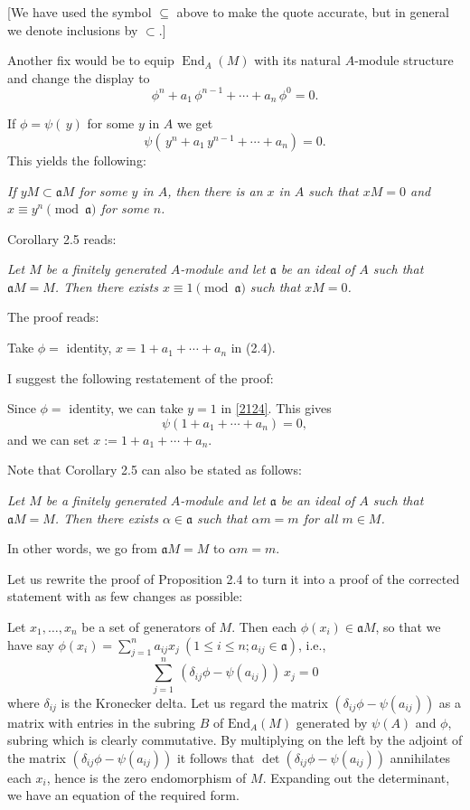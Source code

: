 \documentclass[parskip=half]{scrartcl}%
\newcommand{\mf}{\mathfrak}
\begin{document}
[We have used the symbol $\subseteq$ above to make the quote accurate, but in general we denote inclusions by $\subset$.]

Another fix would be to equip $\operatorname{End}_A(M)$ with its natural $A$-module structure and change the display to 
$$
\phi^n+a_1\,\phi^{n-1}+\cdots+a_n\,\phi^0=0.
$$

If $\phi=\psi(\,y)$ for some $y$ in $A$ we get 
\begin{equation}\label{2124}
\psi(\,y^n+a_1\,y^{n-1}+\cdots+a_n)=0.
\end{equation}
This yields the following:

\emph{If $yM\subset\mf aM$ for some $y$ in $A$, then there is an $x$ in $A$ such that $xM=0$ and $x\equiv y^n\pmod{\mf a}$ for some $n$.}

Corollary 2.5 reads:

\emph{Let $M$ be a finitely generated $A$-module and let $\mf a$ be an ideal of $A$ such that $\mf aM=M$. Then there exists $x\equiv1\pmod{\mf a}$ such that $xM=0$.}

The proof reads:

Take $\phi=$ identity, $x=1+a_1+\cdots+a_n$ in (2.4).

I suggest the following restatement of the proof:

Since $\phi=$ identity, we can take $y=1$ in \eqref{2124}. This gives 
$$
\psi(1+a_1+\cdots+a_n)=0,
$$ 
and we can set $x:=1+a_1+\cdots+a_n$.

Note that Corollary 2.5 can also be stated as follows:

\emph{Let $M$ be a finitely generated $A$-module and let $\mf a$ be an ideal of $A$ such that $\mf aM=M$. Then there exists $\alpha\in\mf a$ such that $\alpha m=m$ for all $m\in M$.}

In other words, we go from $\mf aM=M$ to $\alpha m=m$.

Let us rewrite the proof of Proposition 2.4 to turn it into a proof of the corrected statement with as few changes as possible:

Let $x_1,\dots,x_n$ be a set of generators of $M$. Then each $\phi(x_i)\in\mf aM$, so that we have say $\phi(x_i)=\sum_{j=1}^na_{ij}x_j\ (1\le i\le n; a_{ij}\in\mf a)$, i.e., 
$$
\sum_{j=1}^n\ (\delta_{ij}\phi-\psi(a_{ij}))\ x_j=0
$$ 
where $\delta_{ij}$ is the Kronecker delta. Let us regard the matrix $(\delta_{ij}\phi-\psi(a_{ij}))$ as a matrix with entries in the subring $B$ of $\text{End}_A(M)$ generated by $\psi(A)$ and $\phi$, subring which is clearly commutative. By multiplying on the left by the adjoint of the matrix $(\delta_{ij}\phi-\psi(a_{ij}))$ it follows that $\det(\delta_{ij}\phi-\psi(a_{ij}))$ annihilates each $x_i$, hence is the zero endomorphism of $M$. Expanding out the determinant, we have an equation of the required form.
\end{document}
